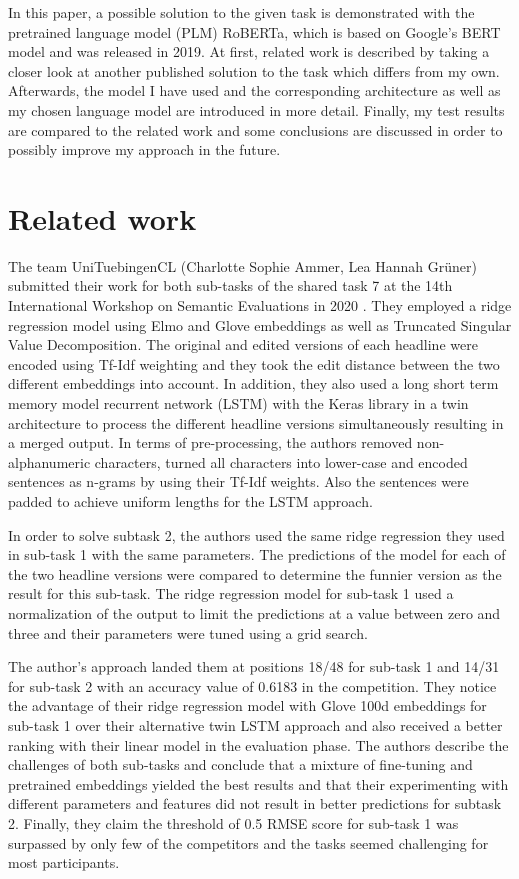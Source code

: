 \documentclass[11pt,a4paper,onecolumn,oneside,notitlepage]{article}
\begin{document}
	In this paper, a possible solution to the given task is demonstrated with the pretrained language model (PLM) RoBERTa, which is based on Google's BERT model and was released in 2019. At first, related work is described by taking a closer look at another published solution to the task which differs from my own. Afterwards, the model I have used and the corresponding architecture as well as my chosen language model are introduced in more detail. Finally, my test results are compared to the related work and some conclusions are discussed in order to possibly improve my approach in the future.


	\section{Related work}
	The team UniTuebingenCL (Charlotte Sophie Ammer, Lea Hannah Grüner) submitted their work for both sub-tasks of the shared task 7 at the 14th International Workshop on Semantic Evaluations in 2020 \citep{ammer-gruner-2020-unituebingencl}. They employed a ridge regression model using Elmo and Glove embeddings as well as Truncated Singular Value Decomposition. The original and edited versions of each headline were encoded using Tf-Idf weighting and they took the edit distance between the two different embeddings into account. In addition, they also used a long short term memory model recurrent network (LSTM) with the Keras library in a twin architecture to process the different headline versions simultaneously resulting in a merged output. In terms of pre-processing, the authors removed non-alphanumeric characters, turned all characters into lower-case and encoded sentences as n-grams by using their Tf-Idf weights. Also the sentences were padded to achieve uniform lengths for the LSTM approach.

	In order to solve subtask 2, the authors used the same ridge regression they used in sub-task 1 with the same parameters. The predictions of the model for each of the two headline versions were compared to determine the funnier version as the result for this sub-task. The ridge regression model for sub-task 1 used a normalization of the output to limit the predictions at a value between zero and three and their parameters were tuned using a grid search.

	The author's approach landed them at positions 18/48 for sub-task 1 and 14/31 for sub-task 2 with an accuracy value of 0.6183 in the competition. They notice the advantage of their ridge regression model with Glove 100d embeddings for sub-task 1 over their alternative twin LSTM approach and also received a better ranking with their linear model in the evaluation phase. The authors describe the challenges of both sub-tasks and conclude that a mixture of fine-tuning and pretrained embeddings yielded the best results and that their experimenting with different parameters and features did not result in better predictions for subtask 2. Finally, they claim the threshold of 0.5 RMSE score for sub-task 1 was surpassed by only few of the competitors and the tasks seemed challenging for most participants.
\end{document}
